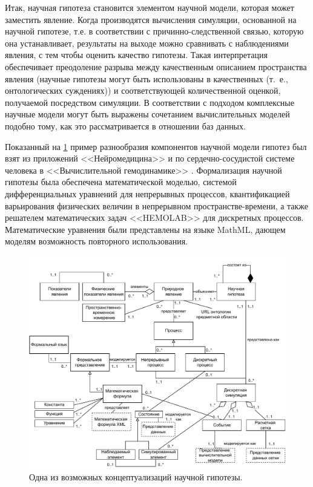 Итак, научная гипотеза становится элементом научной модели, которая может заместить явление. Когда производятся 
вычисления симуляции, основанной на научной гипотезе, т.е. в соответствии с причинно-следственной связью, которую 
она устанавливает, результаты на выходе можно сравнивать с наблюдениями явления, с тем чтобы оценить качество гипотезы. 
Такая интерпретация обеспечивает преодоление разрыва между качественным описанием пространства явления (научные 
гипотезы могут быть использованы в качественных (т.~е., онтологических суждениях)) и соответствующей количественной 
оценкой, получаемой посредством симуляции. В соответствии с подходом \cite{porto2013} комплексные научные модели могут 
быть выражены сочетанием вычислительных моделей подобно тому, как это рассматривается в отношении баз данных.

Показанный на \cref{fig:ScHypoConcept} пример разнообразия компонентов научной модели гипотез был взят из приложений 
<<Нейромедицина>> \cite{porto2013, porto2012scientific} и по сердечно-сосудистой системе человека в 
<<Вычислительной гемодинамике>> \cite{Goncalves2013, Porto2011}. Формализация научной гипотезы была обеспечена 
математической моделью, системой дифференциальных уравнений для непрерывных процессов, квантификацией варьирования 
физических величин в непрерывном пространстве-времени, а также решателем математических задач <<HEMOLAB>> для 
дискретных процессов. Математические уравнения были представлены на языке MathML, дающем моделям возможность 
повторного использования. 

\begin{figure}[ht]
    \centering
    \includegraphics[width=\linewidth]{images/ScHypoConcept}
    \caption{Одна из возможных концептуализаций научной гипотезы.}\label{fig:ScHypoConcept}
\end{figure}

